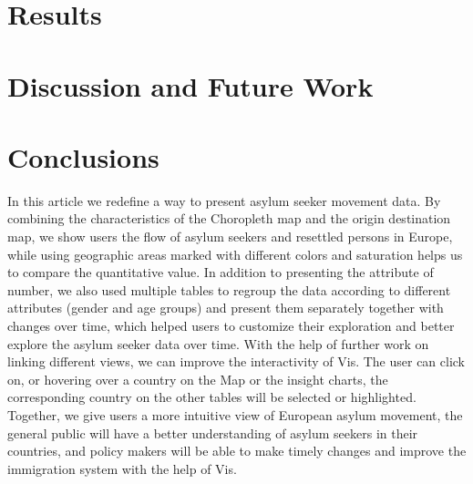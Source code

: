 \documentclass[journal]{vgtc}                %
\begin{document}
\begin{table}[b]
\begin{tabular}{p{0.18\linewidth}p{0.5\linewidth}p{0.12\linewidth}p{0.12\linewidth}}
  \end{tabular}
\end{table}

\section{Results}
\section{Discussion and Future Work}
\section{Conclusions}

In this article we redefine a way to present asylum seeker movement data. By combining the characteristics of the Choropleth map and the origin destination map, we show users the flow of asylum seekers and resettled persons in Europe, while using geographic areas marked with different colors and saturation helps us to compare the quantitative value. In addition to presenting the attribute of number, we also used multiple tables to regroup the data according to different attributes (gender and age groups) and present them separately together with changes over time, which helped users to customize their exploration and better explore the asylum seeker data over time. With the help of further work on linking different views, we can improve the interactivity of Vis. The user can click on, or hovering over  a country on the Map or the insight charts, the corresponding country on the other tables will be selected or highlighted. Together, we give users a more intuitive view of European asylum movement, the general public will have a better understanding of asylum seekers in their countries, and policy makers will be able to make timely changes and improve the immigration system with the help of Vis.



%
%
%

%


\end{document}
